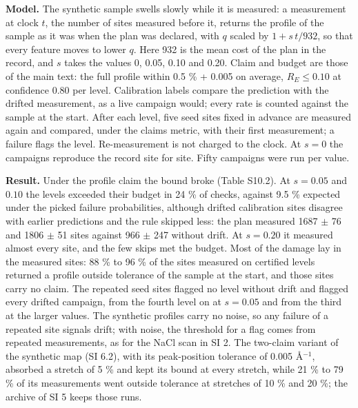 \documentclass{iopjournal}
\begin{document}
\textbf{Model.} The synthetic sample swells slowly while it is measured: a measurement at clock \(t\), the number of sites measured before it, returns the profile of the sample as it was when the plan was declared, with \(q\) scaled by \(1 + s\,t/932\), so that every feature moves to lower \(q\). Here 932 is the mean cost of the plan in the record, and \(s\) takes the values 0, 0.05, 0.10 and 0.20. Claim and budget are those of the main text: the full profile within 0.5 \% + 0.005 on average, \(R_E \le 0.10\) at confidence 0.80 per level. Calibration labels compare the prediction with the drifted measurement, as a live campaign would; every rate is counted against the sample at the start. After each level, five seed sites fixed in advance are measured again and compared, under the claim\textquotesingle s metric, with their first measurement; a failure flags the level. Re-measurement is not charged to the clock. At \(s = 0\) the campaigns reproduce the record site for site. Fifty campaigns were run per value.

\textbf{Result.} Under the profile claim the bound broke (Table S10.2). At \(s = 0.05\) and \(0.10\) the levels exceeded their budget in 24 \% of checks, against 9.5 \% expected under the picked failure probabilities, although drifted calibration sites disagree with earlier predictions and the rule skipped less: the plan measured 1687 \ensuremath{\pm} 76 and 1806 \ensuremath{\pm} 51 sites against 966 \ensuremath{\pm} 247 without drift. At \(s = 0.20\) it measured almost every site, and the few skips met the budget. Most of the damage lay in the measured sites: 88 \% to 96 \% of the sites measured on certified levels returned a profile outside tolerance of the sample at the start, and those sites carry no claim. The repeated seed sites flagged no level without drift and flagged every drifted campaign, from the fourth level on at \(s = 0.05\) and from the third at the larger values. The synthetic profiles carry no noise, so any failure of a repeated site signals drift; with noise, the threshold for a flag comes from repeated measurements, as for the NaCl scan in SI 2. The two-claim variant of the synthetic map (SI 6.2), with its peak-position tolerance of 0.005 \AA{}\ensuremath{^{-1}}, absorbed a stretch of 5 \% and kept its bound at every stretch, while 21 \% to 79 \% of its measurements went outside tolerance at stretches of 10 \% and 20 \%; the archive of SI 5 keeps those runs.
\end{document}
